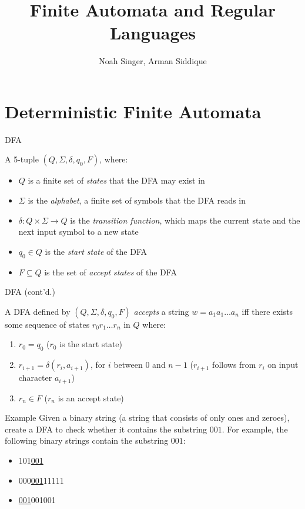 \documentclass{beamer}
\title{Finite Automata and Regular Languages}
\author{Noah Singer, Arman Siddique}
\institute{Montgomery Blair High School Computer Team}
\begin{document}

\begin{frame}
  \titlepage
\end{frame}

\section{Deterministic Finite Automata}

\begin{frame}{DFA}
\begin{definition}
A 5-tuple $(Q, \Sigma, \delta, q_0, F)$, where:
\begin{itemize}
\item $Q$ is a finite set of \textit{states} that the DFA may exist in
\item $\Sigma$ is the \textit{alphabet}, a finite set of symbols that the DFA reads in
\item $\delta: Q \times \Sigma \to Q$ is the \textit{transition function}, which maps the current state and the next input symbol to a new state
\item $q_0 \in Q$ is the \textit{start state} of the DFA
\item $F \subseteq Q$ is the set of \textit{accept states} of the DFA
\end{itemize}
\end{definition}
\end{frame}

\begin{frame}{DFA (cont'd.)}
\begin{definition}
A DFA defined by $(Q, \Sigma, \delta, q_0, F)$ \textit{accepts} a string $w = a_1 a_1 \ldots a_n$ iff there exists some sequence of states $r_0 r_1 \ldots r_n$ in $Q$ where:
\begin{enumerate}
\item $r_0 = q_0$ ($r_0$ is the start state)
\item $r_{i+1} = \delta (r_i, a_{i+1})$, for $i$ between $0$ and $n-1$ ($r_{i+1}$ follows from $r_i$ on input character $a_{i+1}$)
\item $r_n \in F$ ($r_n$ is an accept state)
\end{enumerate}
\end{definition}
\end{frame}

\begin{frame}{Example}
Given a binary string (a string that consists of only ones and zeroes), create a DFA to check whether it contains the substring $001$.
For example, the following binary strings contain the substring $001$:
\begin{itemize}
\item 101\underline{001}
\item 000\underline{001}11111
\item \underline{001}001001
\end{itemize}
\end{frame}
\end{document}
